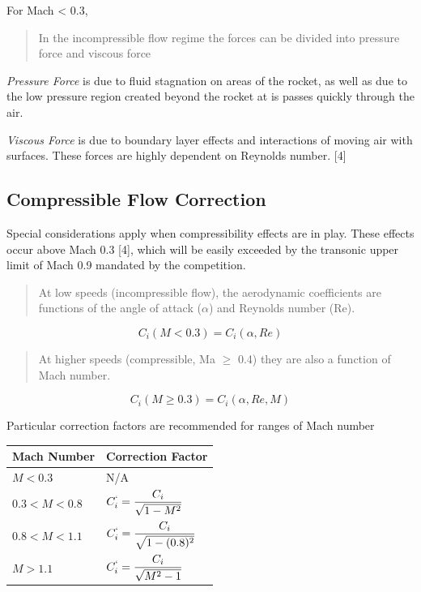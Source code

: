 \documentclass[]{article}
\begin{document}
For Mach \textless{} 0.3,

\begin{quote}
In the incompressible flow regime the forces can be divided into
pressure force and viscous force
\end{quote}

\emph{Pressure Force} is due to fluid stagnation on areas of the rocket,
as well as due to the low pressure region created beyond the rocket at
is passes quickly through the air.

\emph{Viscous Force} is due to boundary layer effects and interactions
of moving air with surfaces. These forces are highly dependent on
Reynolds number. {[}4{]}

\subsection{Compressible Flow
Correction}\label{compressible-flow-correction}

Special considerations apply when compressibility effects are in play.
These effects occur above Mach 0.3 {[}4{]}, which will be easily
exceeded by the transonic upper limit of Mach 0.9 mandated by the
competition.

\begin{quote}
At low speeds (incompressible flow), the aerodynamic coefficients are
functions of the angle of attack (\(\alpha\)) and Reynolds number (Re).
\end{quote}

\begin{equation}
C_i (M < 0.3) = C_i (\alpha, Re) 
\end{equation}

\begin{quote}
At higher speeds (compressible, Ma \(\ge\) 0.4) they are also a function
of Mach number.
\end{quote}

\begin{equation}
C_i (M \ge 0.3) = C_i (\alpha, Re, M)
\end{equation}

Particular correction factors are recommended for ranges of Mach number

\begin{longtable}[c]{@{}ll@{}}
\toprule
Mach Number & Correction Factor\tabularnewline
\midrule
\endhead
\( M < 0.3 \) & N/A\tabularnewline
\( 0.3 < M < 0.8 \) &
\( C^`_i = \dfrac{C_i}{\sqrt{1-M^2}} \)\tabularnewline
\( 0.8 < M < 1.1 \) &
\( C^`_i = \dfrac{C_i}{\sqrt{1-(0.8)^2}} \)\tabularnewline
\( M > 1.1 \) & \( C^`_i = \dfrac{C_i}{\sqrt{M^2-1}} \)\tabularnewline
\bottomrule
\end{longtable}
\end{document}
